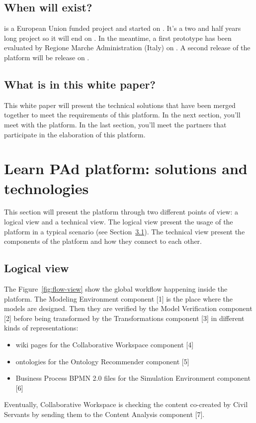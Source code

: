 \documentclass{learnpad}
\begin{document}
\section{When will \learnpad exist?}
\learnpad is a European Union funded project and started on
\origdate{}.  It's a two and half years long project so it
will end on .  In the meantime, a first prototype has been
evaluated by Regione Marche Administration (Italy) on .  A
second release of the platform will be release on .

\section{What is in this white paper?}
This white paper will present the technical solutions that have been merged
together to meet the requirements of this \learnpad platform.  In the next
section, you'll meet with the \learnpad platform.  In the last section, you'll
meet the partners that participate in the elaboration of this \learnpad
platform.

\chapter{Learn PAd platform: solutions and technologies}
\label{ch:platform}
This section will present the \learnpad platform through two different points of
view: a logical view and a technical view.  The logical view present the usage
of the platform in a typical scenario (see Section~\ref{sec:flow-view}).  The
technical view present the components of the  platform and how they connect to
each other.

\section{Logical view}
\label{sec:flow-view}
The Figure~\ref{fig:flow-view} show the global workflow happening inside the
\learnpad platform.  The Modeling Environment component [1] is the place where
the models are designed.  Then they are verified by the Model Verification
component [2] before being transformed by the Transformations component [3] in
different kinds of representations:
\begin{itemize}
	\item wiki pages for the Collaborative Workspace component [4]
	\item ontologies for the Ontology Recommender component [5]
	\item Business Process BPMN 2.0 files for the Simulation Environment
		component [6]
\end{itemize}
Eventually, Collaborative Workspace is checking the content co-created by Civil
Servants by sending them to the Content Analysis component [7].
\end{document}
